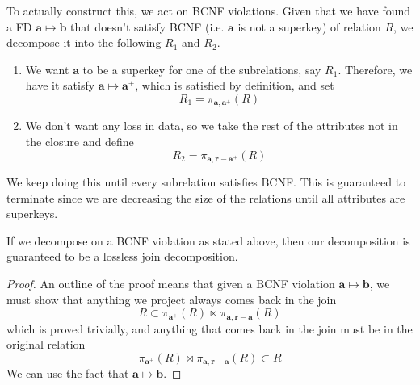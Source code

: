  \begin{algo}
    To actually construct this, we act on BCNF violations. Given that we have found a FD $\mathbf{a} \mapsto \mathbf{b}$ that doesn't satisfy BCNF (i.e. $\mathbf{a}$ is not a superkey) of relation $R$, we decompose it into the following $R_1$ and $R_2$. 
    \begin{enumerate}
      \item We want $\mathbf{a}$ to be a superkey for one of the subrelations, say $R_1$. Therefore, we have it satisfy $\mathbf{a} \mapsto \mathbf{a}^+$, which is satisfied by definition, and set 
        \begin{equation}
          R_1 = \pi_{\mathbf{a}, \mathbf{a}^+} (R)
        \end{equation}
      \item We don't want any loss in data, so we take the rest of the attributes not in the closure and define  
        \begin{equation}
          R_2 = \pi_{\mathbf{a}, \mathbf{r} - \mathbf{a}^+} (R)
        \end{equation}
    \end{enumerate}
    We keep doing this until every subrelation satisfies BCNF. This is guaranteed to terminate since we are decreasing the size of the relations until all attributes are superkeys.  
  \end{algo}

  \begin{theorem}
    \label{thm:lossless-guarantee-for-bcnf}
    If we decompose on a BCNF violation as stated above, then our decomposition is guaranteed to be a lossless join decomposition. 
  \end{theorem}
  \begin{proof}
    An outline of the proof means that given a BCNF violation $\mathbf{a} \mapsto \mathbf{b}$, we must show that anything we project always comes back in the join
    \begin{equation}
      R \subset \pi_{\mathbf{a}^+} (R) \bowtie \pi_{\mathbf{a}, \mathbf{r} - \mathbf{a}} (R)
    \end{equation}
    which is proved trivially, and anything that comes back in the join must be in the original relation
    \begin{equation}
      \pi_{\mathbf{a}^+} (R) \bowtie \pi_{\mathbf{a}, \mathbf{r} - \mathbf{a}} (R) \subset R
    \end{equation}
    We can use the fact that $\mathbf{a} \mapsto \mathbf{b}$. 
  \end{proof}

